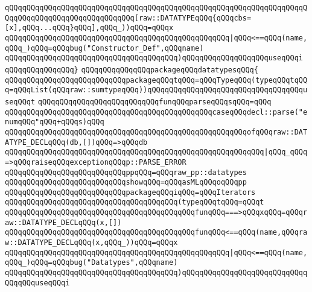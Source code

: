 \verb|qQQqqQQqqQQqqQQqqQQqqQQqqQQqqQQqqQQqqQQqqQQqqQQqqQQqqQQqqQQqqQQqqQQqqQQqqQQqqQQqqQQqqQQqqQQqqQQqqQQq[raw::DATATYPEqQQq{qQQqcbs=[x],qQQq...qQQq}qQQq],qQQq_))qQQq=qQQqx|\newline
\verb|qQQqqQQqqQQqqQQqqQQqqQQqqQQqqQQqqQQqqQQqqQQqqQQqqQQq|\verb#|qQQq<==qQQq(name,qQQq_)qQQq=qQQqbug("Constructor_Def",qQQqname)#\newline
\verb|qQQqqQQqqQQqqQQqqQQqqQQqqQQqqQQqqQQqqQQq)qQQqqQQqqQQqqQQqqQQquseqQQqi|\newline
\verb|qQQqqQQqqQQqqQQq}|\newline
\newline
\verb|qQQqqQQqqQQqqQQqpackageqQQqdatatypesqQQq{|\newline
\newline
\verb|qQQqqQQqqQQqqQQqqQQqqQQqqQQqpackageqQQqtqQQq=qQQqTypeqQQq(typeqQQqtqQQq=qQQqList(qQQqraw::sumtypeqQQq))qQQqqQQqqQQqqQQqqQQqqQQqqQQqqQQqqQQquseqQQqt|\newline
\verb|qQQqqQQqqQQqqQQqqQQqqQQqqQQqfunqQQqparseqQQqsqQQq=qQQq|\newline
\verb|qQQqqQQqqQQqqQQqqQQqqQQqqQQqqQQqqQQqqQQqqQQqqQQqcaseqQQqdecl::parse("enumqQQq"qQQq+qQQqs)qQQq|\newline
\verb|qQQqqQQqqQQqqQQqqQQqqQQqqQQqqQQqqQQqqQQqqQQqqQQqqQQqqQQqofqQQqraw::DATATYPE_DECLqQQq(db,[])qQQq=>qQQqdb|\newline
\verb|qQQqqQQqqQQqqQQqqQQqqQQqqQQqqQQqqQQqqQQqqQQqqQQqqQQqqQQqqQQq|\verb#|qQQq_qQQq=>qQQqraiseqQQqexceptionqQQqp::PARSE_ERROR#\newline
\verb|qQQqqQQqqQQqqQQqqQQqqQQqqQQqppqQQq=qQQqraw_pp::datatypes|\newline
\verb|qQQqqQQqqQQqqQQqqQQqqQQqqQQqshowqQQq=qQQqasMLqQQqoqQQqpp|\newline
\verb|qQQqqQQqqQQqqQQqqQQqqQQqqQQqpackageqQQqiqQQq=qQQqIterators|\newline
\verb|qQQqqQQqqQQqqQQqqQQqqQQqqQQqqQQqqQQqqQQq(typeqQQqtqQQq=qQQqt|\newline
\verb|qQQqqQQqqQQqqQQqqQQqqQQqqQQqqQQqqQQqqQQqqQQqfunqQQq===>qQQqxqQQq=qQQqraw::DATATYPE_DECLqQQq(x,[])|\newline
\verb|qQQqqQQqqQQqqQQqqQQqqQQqqQQqqQQqqQQqqQQqqQQqfunqQQq<==qQQq(name,qQQqraw::DATATYPE_DECLqQQq(x,qQQq_))qQQq=qQQqx|\newline
\verb|qQQqqQQqqQQqqQQqqQQqqQQqqQQqqQQqqQQqqQQqqQQqqQQqqQQq|\verb#|qQQq<==qQQq(name,qQQq_)qQQq=qQQqbug("Datatypes",qQQqname)#\newline
\verb|qQQqqQQqqQQqqQQqqQQqqQQqqQQqqQQqqQQqqQQq)qQQqqQQqqQQqqQQqqQQqqQQqqQQqqQQqqQQquseqQQqi|\newline
